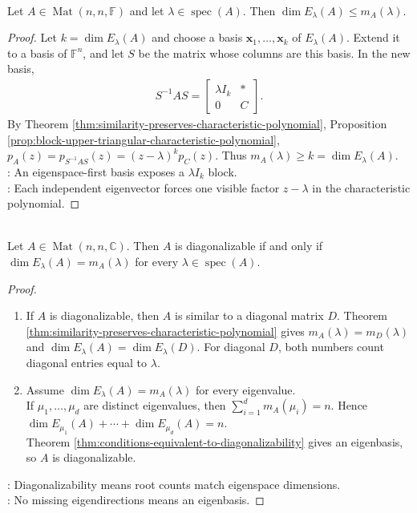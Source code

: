 \begin{theorem} \label{thm:geometric-multiplicity-bounded-by-algebraic-multiplicity} \\
Let $A\in\operatorname{Mat}(n,n,\mathbb{F})$ and let $\lambda\in\operatorname{spec}(A)$. Then $\dim E_{\lambda}(A)\leq m_A(\lambda)$.
\begin{proof}
Let $k=\dim E_{\lambda}(A)$ and choose a basis $\mathbf{x}_1,\ldots,\mathbf{x}_k$ of $E_{\lambda}(A)$. Extend it to a basis of $\mathbb{F}^n$, and let $S$ be the matrix whose columns are this basis. In the new basis,
\begin{align}
S^{-1}AS=
\begin{bmatrix}
\lambda I_k & *\\
0 & C
\end{bmatrix}.
\nonumber
\end{align}
By Theorem \ref{thm:similarity-preserves-characteristic-polynomial}, Proposition \ref{prop:block-upper-triangular-characteristic-polynomial}, $p_A(z)=p_{S^{-1}AS}(z)=(z-\lambda)^kp_C(z)$. Thus $m_A(\lambda)\geq k=\dim E_{\lambda}(A)$.\\
: An eigenspace-first basis exposes a $\lambda I_k$ block.\\
: Each independent eigenvector forces one visible factor $z-\lambda$ in the characteristic polynomial.
\end{proof}
\end{theorem}

\begin{theorem} \label{thm:diagonalizable-iff-algebraic-geometric-multiplicities-match} \\
Let $A\in\operatorname{Mat}(n,n,\mathbb{C})$. Then $A$ is diagonalizable if and only if $\dim E_{\lambda}(A)=m_A(\lambda)$ for every $\lambda\in\operatorname{spec}(A)$.
\begin{proof}
\begin{enumerate}[label=\roman*.]
\setlength{\itemsep}{0pt}
\item[$(\Rightarrow)$] If $A$ is diagonalizable, then $A$ is similar to a diagonal matrix $D$. Theorem \ref{thm:similarity-preserves-characteristic-polynomial} gives $m_A(\lambda)=m_D(\lambda)$ and $\dim E_{\lambda}(A)=\dim E_{\lambda}(D)$. For diagonal $D$, both numbers count diagonal entries equal to $\lambda$.
\item[$(\Leftarrow)$] Assume $\dim E_{\lambda}(A)=m_A(\lambda)$ for every eigenvalue.\\
If $\mu_1,\ldots,\mu_d$ are distinct eigenvalues, then $\sum\limits_{i=1}^{d}m_A(\mu_i)=n$. Hence $\dim E_{\mu_1}(A)+\cdots+\dim E_{\mu_d}(A)=n$.\\
Theorem \ref{thm:conditions-equivalent-to-diagonalizability} gives an eigenbasis, so $A$ is diagonalizable.
\end{enumerate}
: Diagonalizability means root counts match eigenspace dimensions.\\
: No missing eigendirections means an eigenbasis.
\end{proof}
\end{theorem}

